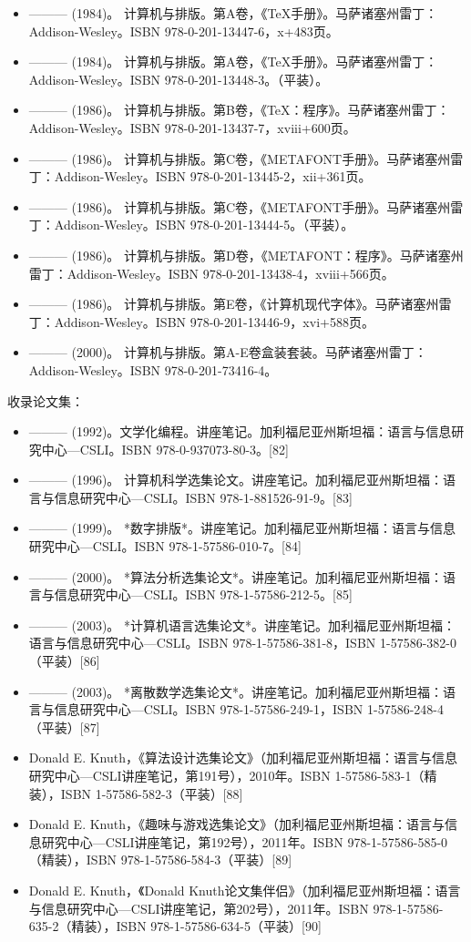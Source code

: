 \begin{itemize}
\item ——— (1984)。 计算机与排版。第A卷，《TeX手册》。马萨诸塞州雷丁：Addison-Wesley。ISBN 978-0-201-13447-6，x+483页。  
\item ——— (1984)。 计算机与排版。第A卷，《TeX手册》。马萨诸塞州雷丁：Addison-Wesley。ISBN 978-0-201-13448-3。（平装）。  
\item ——— (1986)。 计算机与排版。第B卷，《TeX：程序》。马萨诸塞州雷丁：Addison-Wesley。ISBN 978-0-201-13437-7，xviii+600页。  
\item ——— (1986)。 计算机与排版。第C卷，《METAFONT手册》。马萨诸塞州雷丁：Addison-Wesley。ISBN 978-0-201-13445-2，xii+361页。  
\item ——— (1986)。 计算机与排版。第C卷，《METAFONT手册》。马萨诸塞州雷丁：Addison-Wesley。ISBN 978-0-201-13444-5。（平装）。  
\item ——— (1986)。 计算机与排版。第D卷，《METAFONT：程序》。马萨诸塞州雷丁：Addison-Wesley。ISBN 978-0-201-13438-4，xviii+566页。  
\item ——— (1986)。 计算机与排版。第E卷，《计算机现代字体》。马萨诸塞州雷丁：Addison-Wesley。ISBN 978-0-201-13446-9，xvi+588页。  
\item ——— (2000)。 计算机与排版。第A-E卷盒装套装。马萨诸塞州雷丁：Addison-Wesley。ISBN 978-0-201-73416-4。  
\end{itemize}
收录论文集：
\begin{itemize}
\item ——— (1992)。文学化编程。讲座笔记。加利福尼亚州斯坦福：语言与信息研究中心—CSLI。ISBN 978-0-937073-80-3。[82]  
\item ——— (1996)。 计算机科学选集论文。讲座笔记。加利福尼亚州斯坦福：语言与信息研究中心—CSLI。ISBN 978-1-881526-91-9。[83]  
\item ——— (1999)。 *数字排版*。讲座笔记。加利福尼亚州斯坦福：语言与信息研究中心—CSLI。ISBN 978-1-57586-010-7。[84]  
\item ——— (2000)。 *算法分析选集论文*。讲座笔记。加利福尼亚州斯坦福：语言与信息研究中心—CSLI。ISBN 978-1-57586-212-5。[85]  
\item ——— (2003)。 *计算机语言选集论文*。讲座笔记。加利福尼亚州斯坦福：语言与信息研究中心—CSLI。ISBN 978-1-57586-381-8，ISBN 1-57586-382-0（平装）[86]  
\item ——— (2003)。 *离散数学选集论文*。讲座笔记。加利福尼亚州斯坦福：语言与信息研究中心—CSLI。ISBN 978-1-57586-249-1，ISBN 1-57586-248-4（平装）[87]  
\item Donald E. Knuth，《算法设计选集论文》（加利福尼亚州斯坦福：语言与信息研究中心—CSLI讲座笔记，第191号），2010年。ISBN 1-57586-583-1（精装），ISBN 1-57586-582-3（平装）[88]  
\item Donald E. Knuth，《趣味与游戏选集论文》（加利福尼亚州斯坦福：语言与信息研究中心—CSLI讲座笔记，第192号），2011年。ISBN 978-1-57586-585-0（精装），ISBN 978-1-57586-584-3（平装）[89]  
\item Donald E. Knuth，《Donald Knuth论文集伴侣》（加利福尼亚州斯坦福：语言与信息研究中心—CSLI讲座笔记，第202号），2011年。ISBN 978-1-57586-635-2（精装），ISBN 978-1-57586-634-5（平装）[90]
\end{itemize}
